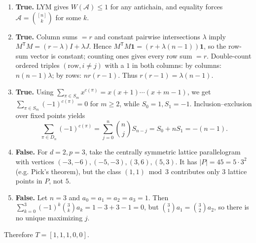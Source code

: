 \SolutionPage
\begin{enumerate}[label=\textbf{\arabic*.},leftmargin=*]
\item \textbf{True.} LYM gives \(W(\mathcal A)\le1\) for any antichain, and equality forces \(\mathcal A=\binom{[n]}{k}\) for some \(k\).

\item \textbf{True.} Column sums \(=r\) and constant pairwise intersections \(\lambda\) imply
\(M^{\mathsf T}M=(r-\lambda)I+\lambda J\). Hence \(M^{\mathsf T}M\mathbf1=(r+\lambda(n-1))\mathbf1\), so the row-sum vector is constant; counting ones gives every row sum \(=r\).
Double-count ordered triples \((\text{row},i\ne j)\) with a \(1\) in both columns:
by columns: \(n(n-1)\lambda\); by rows: \(nr(r-1)\). Thus \(r(r-1)=\lambda(n-1)\).

\item \textbf{True.} Using \(\sum_{\pi\in S_m}x^{c(\pi)}=x(x+1)\cdots(x+m-1)\), we get \(\sum_{\pi\in S_m}(-1)^{c(\pi)}=0\) for \(m\ge2\), while \(S_0=1,S_1=-1\).
Inclusion--exclusion over fixed points yields
\[
\sum_{\pi\in D_n}(-1)^{c(\pi)}=\sum_{j=0}^n\binom{n}{j}S_{n-j}=S_0+nS_1=-(n-1).
\]

\item \textbf{False.} For \(d=2,p=3\), take the centrally symmetric lattice parallelogram with vertices \((-3,-6),(-5,-3),(3,6),(5,3)\).
It has \(|P|=45=5\cdot3^2\) (e.g. Pick’s theorem), but the class \((1,1)\bmod3\) contributes only \(3\) lattice points in \(P\), not \(5\).

\item \textbf{False.} Let \(n=3\) and \(a_0=a_1=a_2=a_3=1\). Then \(\sum_{k=0}^3(-1)^k\binom3k a_k=1-3+3-1=0\), but \(\binom31a_1=\binom32a_2\), so there is no unique maximizing \(j\).
\end{enumerate}
Therefore \(T=[1,1,1,0,0]\).


\NextPage
